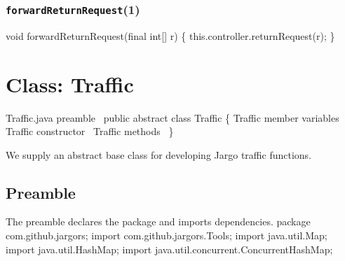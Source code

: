 \subsection{\texttt{forwardReturnRequest}(1)}
\nwenddocs{}\endmoddef{}
void forwardReturnRequest(final int[] r) \{
  this.controller.returnRequest(r);
\}
\eatline
{}\nwendcode{}\nwdocspar



\nwenddocs{}\chapter{Class: Traffic}
\label{traffic}

\nwenddocs{}\endmoddef{}
\LA{}Traffic.java preamble~{\nwtagstyle{}}\RA{}
public abstract class Traffic \{
  \LA{}\code{}Traffic\edoc{} member variables~{\nwtagstyle{}}\RA{}
  \LA{}\code{}Traffic\edoc{} constructor~{\nwtagstyle{}}\RA{}
  \LA{}\code{}Traffic\edoc{} methods~{\nwtagstyle{}}\RA{}
\}
\nwendcode{}\nwdocspar

We supply an abstract base class for developing Jargo traffic functions.

\section{Preamble}
The preamble declares the package and imports dependencies.
\nwenddocs{}\endmoddef{}
package com.github.jargors;
import com.github.jargors.Tools;
import java.util.Map;
import java.util.HashMap;
import java.util.concurrent.ConcurrentHashMap;
\nwendcode{}\nwdocspar

